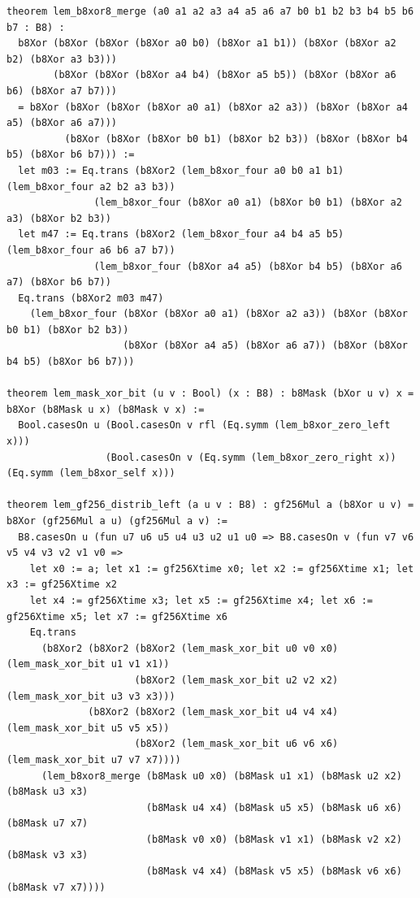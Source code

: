 \documentclass[11pt,letterpaper]{article}
\theoremstyle{spectralthm}
\begin{document}
\begin{lstlisting}[language=Lean4,caption={Standalone Pure Init.Prelude Term-Mode Lean 4 Kernel Suite (thm30--thm61, v0.0.0, 0 sorry, 0 axioms).},label={lst:lean_unified}]
theorem lem_b8xor8_merge (a0 a1 a2 a3 a4 a5 a6 a7 b0 b1 b2 b3 b4 b5 b6 b7 : B8) :
  b8Xor (b8Xor (b8Xor (b8Xor a0 b0) (b8Xor a1 b1)) (b8Xor (b8Xor a2 b2) (b8Xor a3 b3)))
        (b8Xor (b8Xor (b8Xor a4 b4) (b8Xor a5 b5)) (b8Xor (b8Xor a6 b6) (b8Xor a7 b7)))
  = b8Xor (b8Xor (b8Xor (b8Xor a0 a1) (b8Xor a2 a3)) (b8Xor (b8Xor a4 a5) (b8Xor a6 a7)))
          (b8Xor (b8Xor (b8Xor b0 b1) (b8Xor b2 b3)) (b8Xor (b8Xor b4 b5) (b8Xor b6 b7))) :=
  let m03 := Eq.trans (b8Xor2 (lem_b8xor_four a0 b0 a1 b1) (lem_b8xor_four a2 b2 a3 b3))
               (lem_b8xor_four (b8Xor a0 a1) (b8Xor b0 b1) (b8Xor a2 a3) (b8Xor b2 b3))
  let m47 := Eq.trans (b8Xor2 (lem_b8xor_four a4 b4 a5 b5) (lem_b8xor_four a6 b6 a7 b7))
               (lem_b8xor_four (b8Xor a4 a5) (b8Xor b4 b5) (b8Xor a6 a7) (b8Xor b6 b7))
  Eq.trans (b8Xor2 m03 m47)
    (lem_b8xor_four (b8Xor (b8Xor a0 a1) (b8Xor a2 a3)) (b8Xor (b8Xor b0 b1) (b8Xor b2 b3))
                    (b8Xor (b8Xor a4 a5) (b8Xor a6 a7)) (b8Xor (b8Xor b4 b5) (b8Xor b6 b7)))

theorem lem_mask_xor_bit (u v : Bool) (x : B8) : b8Mask (bXor u v) x = b8Xor (b8Mask u x) (b8Mask v x) :=
  Bool.casesOn u (Bool.casesOn v rfl (Eq.symm (lem_b8xor_zero_left x)))
                 (Bool.casesOn v (Eq.symm (lem_b8xor_zero_right x)) (Eq.symm (lem_b8xor_self x)))

theorem lem_gf256_distrib_left (a u v : B8) : gf256Mul a (b8Xor u v) = b8Xor (gf256Mul a u) (gf256Mul a v) :=
  B8.casesOn u (fun u7 u6 u5 u4 u3 u2 u1 u0 => B8.casesOn v (fun v7 v6 v5 v4 v3 v2 v1 v0 =>
    let x0 := a; let x1 := gf256Xtime x0; let x2 := gf256Xtime x1; let x3 := gf256Xtime x2
    let x4 := gf256Xtime x3; let x5 := gf256Xtime x4; let x6 := gf256Xtime x5; let x7 := gf256Xtime x6
    Eq.trans
      (b8Xor2 (b8Xor2 (b8Xor2 (lem_mask_xor_bit u0 v0 x0) (lem_mask_xor_bit u1 v1 x1))
                      (b8Xor2 (lem_mask_xor_bit u2 v2 x2) (lem_mask_xor_bit u3 v3 x3)))
              (b8Xor2 (b8Xor2 (lem_mask_xor_bit u4 v4 x4) (lem_mask_xor_bit u5 v5 x5))
                      (b8Xor2 (lem_mask_xor_bit u6 v6 x6) (lem_mask_xor_bit u7 v7 x7))))
      (lem_b8xor8_merge (b8Mask u0 x0) (b8Mask u1 x1) (b8Mask u2 x2) (b8Mask u3 x3)
                        (b8Mask u4 x4) (b8Mask u5 x5) (b8Mask u6 x6) (b8Mask u7 x7)
                        (b8Mask v0 x0) (b8Mask v1 x1) (b8Mask v2 x2) (b8Mask v3 x3)
                        (b8Mask v4 x4) (b8Mask v5 x5) (b8Mask v6 x6) (b8Mask v7 x7))))


\end{lstlisting}
\end{document}

